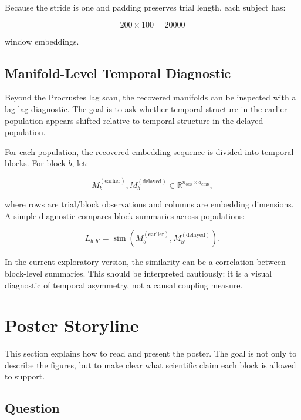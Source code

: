 \documentclass[11pt]{article}
\begin{document}
Because the stride is one and padding preserves trial length, each subject has:

\begin{equation}
200 \times 100 = 20000
\end{equation}

window embeddings.

\subsection{Manifold-Level Temporal Diagnostic}

Beyond the Procrustes lag scan, the recovered manifolds can be inspected with a
lag-lag diagnostic. The goal is to ask whether temporal structure in the
earlier population appears shifted relative to temporal structure in the
delayed population.

For each population, the recovered embedding sequence is divided into temporal
blocks. For block $b$, let:

\begin{equation}
M_b^{(\text{earlier})}, M_b^{(\text{delayed})}
\in \mathbb{R}^{n_{\text{obs}} \times d_{\text{emb}}},
\end{equation}

where rows are trial/block observations and columns are embedding dimensions.
A simple diagnostic compares block summaries across populations:

\begin{equation}
L_{b,b'} =
\operatorname{sim}
\left(
M_b^{(\text{earlier})},
M_{b'}^{(\text{delayed})}
\right).
\end{equation}

In the current exploratory version, the similarity can be a correlation between
block-level summaries. This should be interpreted cautiously: it is a visual
diagnostic of temporal asymmetry, not a causal coupling measure.

\section{Poster Storyline}

This section explains how to read and present the poster. The goal is not only
to describe the figures, but to make clear what scientific claim each block is
allowed to support.

\subsection{Question}
\end{document}
